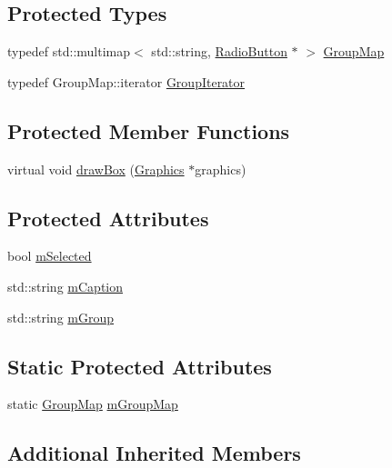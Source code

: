 \subsection*{Protected Types}
\begin{DoxyCompactItemize}
\item 
typedef std\+::multimap$<$ std\+::string, \hyperlink{classgcn_1_1RadioButton}{Radio\+Button} $\ast$ $>$ \hyperlink{classgcn_1_1RadioButton_ae1ca6884bf6ce4bea9ba768366aed302}{Group\+Map}
\item 
typedef Group\+Map\+::iterator \hyperlink{classgcn_1_1RadioButton_ad3dcf28d1a77244db15cee3b6b04bed1}{Group\+Iterator}
\end{DoxyCompactItemize}
\subsection*{Protected Member Functions}
\begin{DoxyCompactItemize}
\item 
virtual void \hyperlink{classgcn_1_1RadioButton_ac0797437f8ea22d1e216ad54af912938}{draw\+Box} (\hyperlink{classgcn_1_1Graphics}{Graphics} $\ast$graphics)
\end{DoxyCompactItemize}
\subsection*{Protected Attributes}
\begin{DoxyCompactItemize}
\item 
bool \hyperlink{classgcn_1_1RadioButton_a303f5ff2b0408763521cbb3c914eadf7}{m\+Selected}
\item 
std\+::string \hyperlink{classgcn_1_1RadioButton_a78dc900d38ec3aa7248ba28743695fff}{m\+Caption}
\item 
std\+::string \hyperlink{classgcn_1_1RadioButton_afa88aecb7276f8d671e24465e4e1c944}{m\+Group}
\end{DoxyCompactItemize}
\subsection*{Static Protected Attributes}
\begin{DoxyCompactItemize}
\item 
static \hyperlink{classgcn_1_1RadioButton_ae1ca6884bf6ce4bea9ba768366aed302}{Group\+Map} \hyperlink{classgcn_1_1RadioButton_afffd36379e905ff1160cf475a784ad02}{m\+Group\+Map}
\end{DoxyCompactItemize}
\subsection*{Additional Inherited Members}


